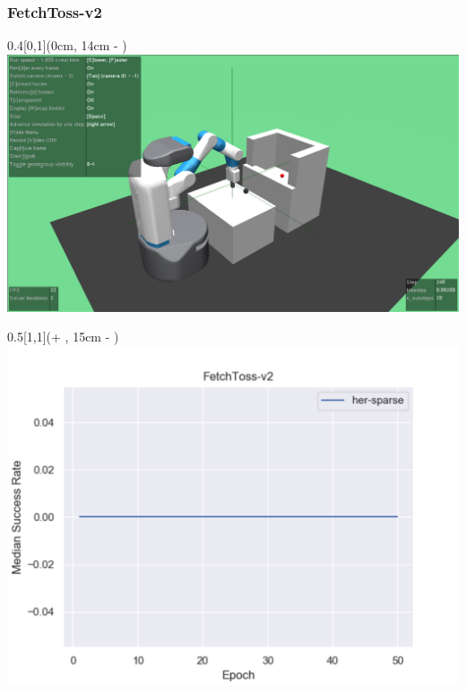 


\begin{frame}
	\frametitle{FetchToss-v2}	
	\vspace{1cm}
	
	\begin{textblock*}{0.4\paperwidth}[0,1](0cm, 14cm - \PraesentationSeitenrand)%
		\includegraphics[width=0.4\paperwidth]{./Ressourcen/Figures/FetchToss-v2.pdf}
	\end{textblock*}
	
	\begin{textblock*}{0.5\paperwidth}[1,1](\textwidth + \PraesentationSeitenrand, 15cm - \PraesentationSeitenrand)%
		\includegraphics[width=0.5\paperwidth]{./Ressourcen/Figures/fig_FetchToss-v2.pdf}
	\end{textblock*}
	
\end{frame}
\clearpage


